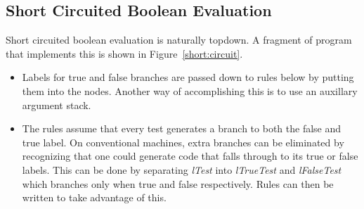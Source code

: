 \subsection{Short Circuited Boolean Evaluation}

Short circuited boolean evaluation is naturally topdown.
A fragment of \twiglang{} program that implements this
is shown in Figure~\ref{short:circuit}.

\begin{itemize}

\item Labels for true and false branches are passed down to
rules below by putting them into the nodes.  Another way of
accomplishing this is to use an auxillary argument stack.

\item The rules assume that every test generates a branch to both
the false and true label.  On conventional machines, extra branches
can be eliminated by recognizing that one could generate code that
falls through to its true or false labels.  This can be done by
separating {\sl lTest} into {\sl lTrueTest} and {\sl lFalseTest} which
branches only when true and false respectively.  Rules can then be
written to take advantage of this.
\end{itemize}

